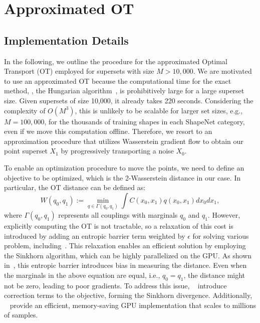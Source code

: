 \section{Approximated OT}
\label{subsec:approx_details}

\subsection{Implementation Details}
In the following, we outline the procedure for the approximated Optimal Transport (OT) employed for supersets with size $M > 10,000$.
%
We are motivated to use an approximated OT because the computational time for the exact method, \ie, the Hungarian algorithm~\cite{kuhn1955hungarian}, is prohibitively large for a large superset size.
%
Given supersets of size 10,000, it already takes 220 seconds.
%
Considering the complexity of $O(M^3)$, this is unlikely to be scalable for larger set sizes, e.g., $M = 100,000$, for the thousands of training shapes in each ShapeNet category, even if we move this computation offline.
%
Therefore, we resort to an approximation procedure that utilizes Wasserstein gradient flow to obtain our point superset $X_1$ by progressively transporting a noise $X_0$.

To enable an optimization procedure to move the points, we need to define an objective to be optimized, which is the 2-Wasserstein distance in our case.
%
In particular, the OT distance can be defined as:
\begin{equation}
    W(q_0, q_1) := \min_{q \in \Gamma(q_0, q_1)} \int C(x_0, x_1) q(x_0, x_1) dx_0 dx_1,
\end{equation}
%
where $\Gamma(q_0, q_1)$ represents all couplings with marginals $q_0$ and $q_1$.
%
However, explicitly computing the OT is not tractable, so a relaxation of this cost is introduced by adding an entropic barrier term weighted by $\epsilon$ for solving various problem, including~\cite{leonard2012schrodinger}.
%
This relaxation enables an efficient solution by employing the Sinkhorn algorithm, which can be highly parallelized on the GPU.
%
As shown in~\cite{feydy2019interpolating}, this entropic barrier introduces bias in measuring the distance. Even when the marginals in the above equation are equal, i.e., $q_0 = q_1$, the distance might not be zero, leading to poor gradients.
%
To address this issue, ~\citet{genevay2018learning} introduce correction terms to the objective, forming the Sinkhorn divergence.
%
Additionally, ~\citet{feydy2019interpolating} provide an efficient, memory-saving GPU implementation that scales to millions of samples.

